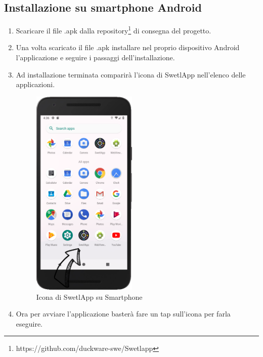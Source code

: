 \subsection{Installazione su smartphone Android}
\begin{enumerate}
	\item Scaricare il file .apk dalla repository\footnote{https://github.com/duckware-swe/Swetlapp} di consegna del progetto.
	\item Una volta scaricato il file .apk installare nel proprio dispositivo Android l'applicazione e seguire i passaggi dell'installazione.
	\item Ad installazione terminata comparirà l'icona di SwetlApp nell'elenco delle applicazioni.
	\begin{figure}[htbp]
		\centering
		\includegraphics[width=5cm]{../includes/pics/screen1.PNG}
		\caption{\label{fig:screen1}Icona di SwetlApp su Smartphone}
	\end{figure}
	\item Ora per avviare l'applicazione basterà fare un tap sull'icona per farla eseguire.
\end{enumerate}



